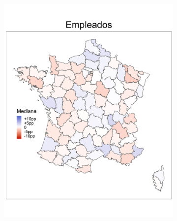 \begin{figure}
\begin{subfigure}{0.235\textwidth}
	\includegraphics[width = \textwidth]{Figs/Efectos/Mapa_Efectos_CSP5_Modelo_H}
	\end{subfigure}
	~
	\begin{subfigure}{0.235\textwidth}

\end{subfigure}
\end{figure}
